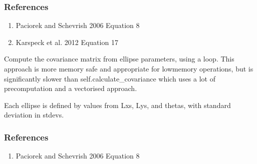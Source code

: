 \documentclass[letterpaper,10pt,english]{sphinxmanual}
\begin{document}
\begin{fulllineitems}
\begin{fulllineitems}
\begin{quote}
\begin{description}
\end{description}\end{quote}
\subsubsection*{References}
\begin{enumerate}
%
\item {}
\sphinxAtStartPar
Paciorek and Schevrish 2006  Equation 8

\item {}
\sphinxAtStartPar
Karspeck et al. 2012  Equation 17

\end{enumerate}

\end{fulllineitems}


\begin{fulllineitems}
\label{\detokenize{ellipse:glomar_gridding.ellipse.EllipseCovarianceBuilder.calculate_covariance_loop}}
\pysigstartsignatures
\pysiglinewithargsret
{}
{}
{}
\pysigstopsignatures
\sphinxAtStartPar
Compute the covariance matrix from ellipse parameters, using a loop.
This approach is more memory safe and appropriate for low\sphinxhyphen{}memory
operations, but is significantly slower than self.calculate\_covariance
which uses a lot of pre\sphinxhyphen{}computation and a vectorised approach.

\sphinxAtStartPar
Each ellipse is defined by values from Lxs, Lys, and thetas, with
standard deviation in stdevs.
\begin{quote}\begin{description}
\sphinxAtStartPar
{}

\end{description}\end{quote}
\subsubsection*{References}
\begin{enumerate}
%
\item {}
\sphinxAtStartPar
Paciorek and Schevrish 2006  Equation 8


\end{enumerate}
\end{fulllineitems}
\end{fulllineitems}
\end{document}
